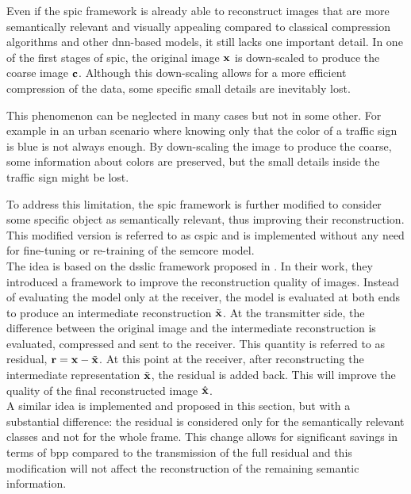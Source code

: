Even if the \gls{spic} framework is already able to reconstruct images that are more semantically relevant and visually appealing compared to classical compression algorithms and other \gls{dnn}-based models, it still lacks one important detail.
In one of the first stages of \gls{spic}, the original image $\mathbf{x}$ is down-scaled to produce the coarse image $\mathbf{c}$. Although this down-scaling allows for a more efficient compression of the data, some specific small details are inevitably lost.

This phenomenon can be neglected in many cases but not in some other. For example in an urban scenario where knowing only that  the color of a traffic sign is blue is not always enough. By down-scaling the image to produce the coarse, some information about colors are preserved, but the small details  inside the traffic sign might be lost.

To address this limitation, the \gls{spic} framework is further modified to consider some specific object as semantically relevant, thus improving their reconstruction. This modified version is referred to as \gls{cspic} and is implemented without any need for fine-tuning or re-training of the \gls{semcore} model.\\

The idea is based on the \gls{dsslic} framework proposed in \cite{Akbari2019DSSLIC}. In their work, they introduced a framework to improve the reconstruction quality of images. Instead of evaluating the model only at the receiver, the model is evaluated at both ends to produce an intermediate reconstruction $\tilde{\mathbf{x}}$. At the transmitter side, the difference between the original image and the intermediate reconstruction is evaluated, compressed and sent to the receiver. This quantity is referred to as residual, $\mathbf{r} = \mathbf{x} - \tilde{\mathbf{x}}$. At this point at the receiver, after reconstructing the intermediate representation $\tilde{\mathbf{x}}$, the residual is added back. This will improve the quality of the final reconstructed image $\hat{\mathbf{x}}$.\\

A similar idea is implemented and proposed in this section, but with a substantial difference: the residual is considered only for the semantically relevant classes and not for the whole frame. This change allows for significant savings in terms of \gls{bpp} compared to the transmission of the full residual and this modification will not affect the reconstruction of the remaining semantic information.

